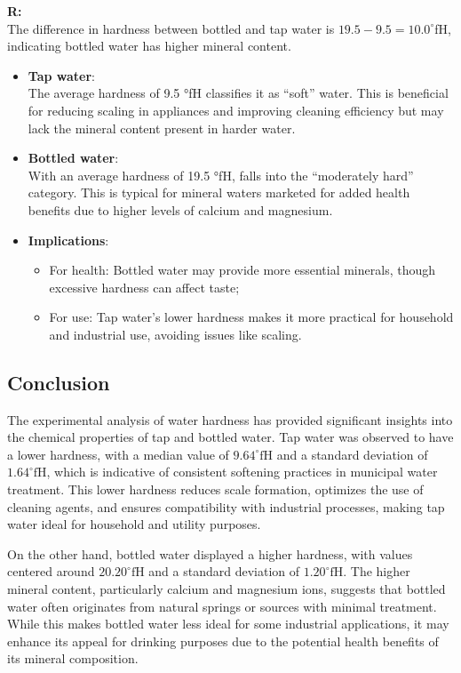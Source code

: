\documentclass{article}
\begin{document}
\begin{enumerate}
    \textbf{R:\\}
    The difference in hardness between bottled and tap water is $19.5 - 9.5 =10.0 ^\circ$fH,
    indicating bottled water has higher mineral content.
    \begin{itemize}
        \item \textbf{Tap water}:\\
        The average hardness of 9.5 °fH classifies it as ``soft'' water. This is beneficial for reducing scaling in appliances and improving cleaning efficiency but may lack the mineral content present in harder water.

        \item \textbf{Bottled water}:\\
        With an average hardness of 19.5 °fH, falls into the ``moderately hard'' category. This is typical for mineral waters marketed for added health benefits due to higher levels of calcium and magnesium.

        \item \textbf{Implications}:
        \begin{itemize}
            \item For health: Bottled water may provide more essential minerals, though excessive hardness can affect taste;
            \item For use: Tap water's lower hardness makes it more practical for household and industrial use, avoiding issues like scaling.
        \end{itemize}
    \end{itemize}
\end{enumerate}

\subsection{Conclusion}
The experimental analysis of water hardness has provided significant insights into the chemical properties of tap and bottled water. Tap water was observed to have a lower hardness, with a median value of \(9.64^\circ\text{fH}\) and a standard deviation of \(1.64^\circ\text{fH}\), which is indicative of consistent softening practices in municipal water treatment. This lower hardness reduces scale formation, optimizes the use of cleaning agents, and ensures compatibility with industrial processes, making tap water ideal for household and utility purposes.

On the other hand, bottled water displayed a higher hardness, with values centered around \(20.20^\circ\text{fH}\) and a standard deviation of \(1.20^\circ\text{fH}\). The higher mineral content, particularly calcium and magnesium ions, suggests that bottled water often originates from natural springs or sources with minimal treatment. While this makes bottled water less ideal for some industrial applications, it may enhance its appeal for drinking purposes due to the potential health benefits of its mineral composition.
\end{document}
